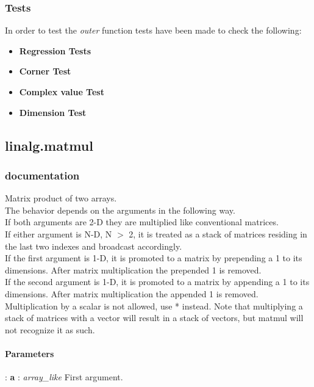 \documentclass[a4paper,11pt]{article}
\begin{document}
\subsubsection{Tests}

In order to test the \textit{outer} function tests have been made to check the following:

\begin{itemize}
	\item \textbf{Regression Tests}
	\item \textbf{Corner Test}
	\item \textbf{Complex value Test}
	\item \textbf{Dimension Test}
\end{itemize}

\subsection{linalg.matmul}
\subsubsection{documentation}
Matrix product of two arrays.\\ The behavior depends on the arguments in the following way.\\

If both arguments are 2-D they are multiplied like conventional matrices.\\ If either argument is N-D, N $ > $ 2, it is treated as a stack of matrices residing in the last two indexes and broadcast accordingly.\\ If the first argument is 1-D, it is promoted to a matrix by prepending a 1 to its dimensions. After matrix multiplication the prepended 1 is removed.\\ If the second argument is 1-D, it is promoted to a matrix by appending a 1 to its dimensions. After matrix multiplication the appended 1 is removed.\\ Multiplication by a scalar is not allowed, use * instead. Note that multiplying a stack of matrices with a vector will result in a stack of vectors, but matmul will not recognize it as such.\\


\paragraph{Parameters}:	
\textbf{a} : \textit{array\_like} First argument.
\end{document}
